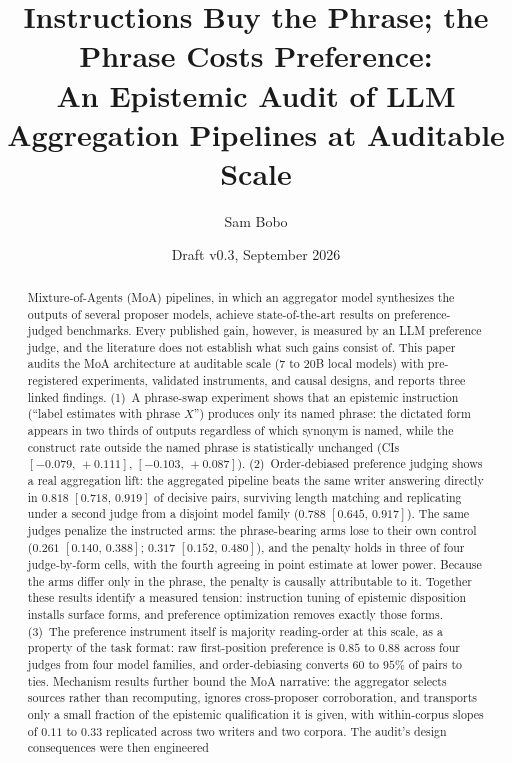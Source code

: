 \documentclass[11pt]{article}
\title{Instructions Buy the Phrase; the Phrase Costs Preference:\\
An Epistemic Audit of LLM Aggregation Pipelines at Auditable Scale}
\author{Sam Bobo}
\date{Draft v0.3, September 2026}
\newcommand{\ci}[2]{\ensuremath{[#1,\,#2]}}
\begin{document}
\maketitle

\begin{abstract}
Mixture-of-Agents (MoA) pipelines, in which an aggregator model
synthesizes the outputs of several proposer models, achieve
state-of-the-art results on preference-judged benchmarks. Every
published gain, however, is measured by an LLM preference judge, and
the literature does not establish what such gains consist of. This
paper audits the MoA architecture at auditable scale (7 to 20B local
models) with pre-registered experiments, validated instruments, and
causal designs, and reports three linked findings. (1)~A phrase-swap
experiment shows that an epistemic instruction (``label estimates with
phrase $X$'') produces only its named phrase: the dictated form appears
in two thirds of outputs regardless of which synonym is named, while
the construct rate outside the named phrase is statistically unchanged
(CIs $\ci{-0.079}{+0.111}$, $\ci{-0.103}{+0.087}$). (2)~Order-debiased
preference judging shows a real aggregation lift: the aggregated
pipeline beats the same writer answering directly in $0.818$
\ci{0.718}{0.919} of decisive pairs, surviving length matching and
replicating under a second judge from a disjoint model family ($0.788$
\ci{0.645}{0.917}). The same judges penalize the instructed arms: the
phrase-bearing arms lose to their own control ($0.261$
\ci{0.140}{0.388}; $0.317$ \ci{0.152}{0.480}), and the penalty holds
in three of four judge-by-form cells, with the fourth agreeing in point
estimate at lower power. Because the arms differ only in the phrase,
the penalty is causally attributable to it. Together these results
identify a measured tension: instruction tuning of epistemic
disposition installs surface forms, and preference optimization
removes exactly those forms. (3)~The preference instrument itself is
majority reading-order at this scale, as a property of the task
format: raw first-position preference is $0.85$ to $0.88$ across four
judges from four model families, and order-debiasing converts $60$ to
$95\%$ of pairs to ties. Mechanism results further bound the MoA
narrative: the aggregator selects sources rather than recomputing,
ignores cross-proposer corroboration, and transports only a small
fraction of the epistemic qualification it is given, with
within-corpus slopes of $0.11$ to $0.33$ replicated across two writers
and two corpora. The audit's design consequences were then engineered

\end{abstract}
\end{document}
